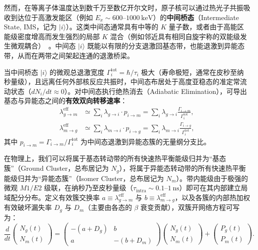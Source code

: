 然而，在等离子体温度达到数千万至数亿开尔文时，原子核可以通过热光子共振吸收到达位于高激发能区（例如 $E_x \sim 600$--$1000\ \mathrm{keV}$）的\textbf{中间桥态}（Intermediate State, IMS，记为 $|i\rangle$）。这类中间态通常具有中等的 $K$ 量子数，或者由于高能区能级密度增高而发生强烈的局部 $K$ 混合（例如邻近具有相同自旋宇称的双能级发生微观耦合）~\cite{gintautas-2009-176lu-thermal-equilibration,gosselin-2010-plasma-isomers-176lu-180ta}。中间态 $|i\rangle$ 既能以有限的分支退激回基态带，也能退激到异能态带，从而在两带之间架起连通的退激桥梁。

当中间桥态 $|i\rangle$ 的微观总退激宽度 $\Gamma_i^{\mathrm{tot}} = \hbar / \tau_i$ 极大（寿命极短，通常在皮秒至纳秒量级），且远离任何外部核反应共振时，中间态布居处于高度亚稳态的准定常流动状态（$dN_i/dt \approx 0$）。对中间态执行绝热消去（Adiabatic Elimination），可导出基态与异能态之间的\textbf{有效双向转移速率}：
\begin{align}
\lambda_{g \to m}^{\mathrm{eff}} &\simeq \sum_i \lambda_{g \to i} \cdot p_{i \to m} = \sum_i \lambda_{g \to i} \frac{\Gamma_{i \to m}}{\Gamma_i^{\mathrm{tot}}}, \label{eq:4-8-gtom-eff}\\
\lambda_{m \to g}^{\mathrm{eff}} &\simeq \sum_i \lambda_{m \to i} \cdot p_{i \to g} = \sum_i \lambda_{m \to i} \frac{\Gamma_{i \to g}}{\Gamma_i^{\mathrm{tot}}}, \label{eq:4-8-mtog-eff}
\end{align}
其中 $p_{i \to m} = \Gamma_{i \to m} / \Gamma_i^{\mathrm{tot}}$ 为中间态退激到异能态簇的无量纲分支比。

在物理上，我们可以将属于基态转动带的所有快速热平衡能级归并为“基态簇”（Ground Cluster，总布居记为 $N_g$），将属于异能态转动带的所有快速热平衡能级归并为“异能态簇”（Isomer Cluster，总布居记为 $N_m$）。带内能级由于极强的微观 $M1/E2$ 级联，在纳秒乃至皮秒量级（$\tau_{\mathrm{intra}} \sim 0.1$--$1\ \mathrm{ns}$）即可在其内部建立局域配分分布。定义有效簇交换率 $a \equiv \lambda_{g \to m}^{\mathrm{eff}}$ 与 $b \equiv \lambda_{m \to g}^{\mathrm{eff}}$，以及各簇的内部热加权有效破坏漏失率 $D_g$ 与 $D_m$（主要由各态的 $\beta$ 衰变贡献），双簇开网络方程可写为：
\begin{equation}\label{eq:4-8-two-cluster-master}
\frac{d}{dt}\begin{pmatrix} N_g(t) \\ N_m(t) \end{pmatrix} =
\begin{pmatrix} -(a + D_g) & b \\ a & -(b + D_m) \end{pmatrix}
\begin{pmatrix} N_g(t) \\ N_m(t) \end{pmatrix} +
\begin{pmatrix} P_g(t) \\ P_m(t) \end{pmatrix}.
\end{equation}

